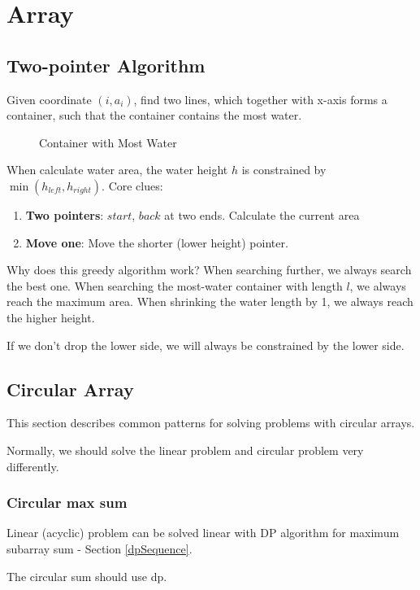 \chapter{Array}
\section{Two-pointer Algorithm}
 Given coordinate $(i, a_i)$, find two lines, which together with x-axis forms a container, such that the container contains the most water.
\begin{figure}[hbtp]
\centering
{}
\caption{Container with Most Water}
\label{fig:Container-With-Most-Water}
\end{figure}

When calculate water area, the water height $h$ is constrained by $\min(h_{left}, h_{right})$. Core clues:
\begin{enumerate}
\item \textbf{Two pointers}: $start$, $back$ at two ends. Calculate the current area
\item \textbf{Move one}: Move the shorter (lower height) pointer. 
\end{enumerate}

Why does this greedy algorithm work? When searching further, we always search the best one.  When searching the most-water container with length $l$, we always reach the maximum area. When shrinking the water length by 1, we always reach the higher height. 

If we don't drop the lower side, we will always be constrained by the lower side. 
\section{Circular Array}
This section describes common patterns for solving problems with circular arrays.

Normally, we should solve the linear problem and circular problem very differently.

\subsection{Circular max sum}
Linear (acyclic) problem can be solved linear with DP algorithm for maximum subarray sum - Section \ref{dpSequence}. 

The circular sum should use dp. 

